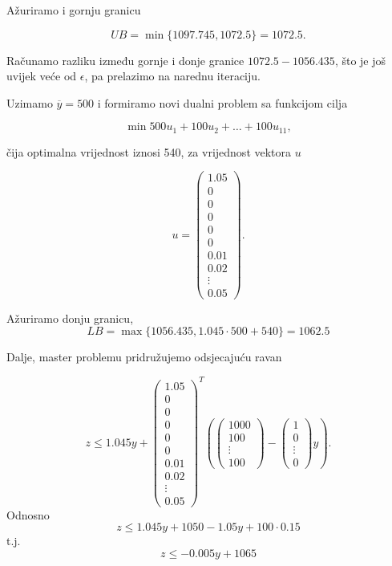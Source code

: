 \documentclass[b5paper, utf8, 11pt, colorlinks]{book}
\theoremstyle{definition}
\begin{document}
 Ažuriramo i gornju granicu

$$UB = \min\{1097.745, 1072.5\} =  1072.5.$$

Računamo razliku između gornje i donje granice $1072.5-1056.435$, što je još uvijek veće od $\epsilon$, pa prelazimo na narednu iteraciju.

Uzimamo 
$\overline{y}=500$ i formiramo novi dualni problem sa funkcijom cilja

$$\min 500u_1+ 100u_2+\ldots+100u_{11},$$

čija optimalna vrijednost iznosi 540, za vrijednost vektora $u$

$$u=\left(\begin{array}{c}
	1.05\\
	0\\
	0\\
	0\\
	0\\
	0\\
	0.01 \\
	0.02 \\
	\vdots \\
	0.05
\end{array}\right).$$

Ažuriramo donju granicu,
$$LB = \max\{1056.435, 1.045\cdot 500+540\} =1062.5 $$


Dalje, master problemu pridružujemo odsjecajuću ravan
 
 
 $$z\leqslant 1.045y+\left(\begin{array}{c}
 	1.05\\
 0\\
 0\\
 0\\
 0\\
 0\\
 0.01 \\
 0.02 \\
 \vdots \\
 0.05
 \end{array}\right)^T
 \left(\left(\begin{array}{c}
 	1000 \\
 	100 \\
 	\vdots \\
 	100
 \end{array}\right)-\left(\begin{array}{c}
 	1 \\
 	0 \\
 	\vdots \\
 	0
 \end{array}\right)y\right).$$
 Odnosno 
 $$z\leqslant 1.045y+1050-1.05y+100\cdot0.15$$
 t.j.
 $$z\leqslant -0.005y+1065$$
 
\end{document}
